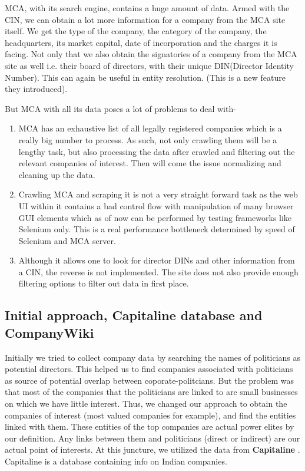 MCA, with its search engine, contains a huge amount of data. Armed with the CIN, we can obtain a lot more information for a company from the MCA site itself. We get the type of the company, the category of the company, the headquarters, its market capital, date of incorporation and the charges it is facing. Not only that we also obtain the signatories of a company from the MCA site as well i.e. their board of directors, with their unique DIN(Director Identity Number). This can again be useful in entity resolution. (This is a new feature they introduced).

But MCA with all its data poses a lot of problems to deal with-
\begin{enumerate}
    \item MCA has an exhaustive list of all legally registered companies which is a really big number to process. As such, not only crawling  them will be a lengthy task, but also processing the data after crawled and filtering out the relevant companies of interest. Then will come the issue normalizing and cleaning up the data.
    \item Crawling MCA and scraping it is not a very straight forward task as the web UI within it contains a bad control flow with  manipulation of many browser GUI elements which as of now can be performed by testing frameworks like Selenium only. This is a real performance bottleneck determined by speed of Selenium and MCA server. 
    \item Although it allows one to look for director DINs and other information from a CIN, the reverse is not implemented. The site does not also provide enough filtering options to filter out data in first place.
\end{enumerate}

\subsection{Initial approach, Capitaline database and CompanyWiki}

Initially we tried to collect company data by searching the names of politicians as potential directors. This helped us to find companies associated with politicians as source of potential overlap between coporate-politcians. But the problem was that most of the companies that the politicians are linked to are small businesses on which we have little interest. Thus, we changed our approach to obtain the companies of interest (most valued companies for example), and find the entities linked with them. These entities of the top companies are actual power elites by our definition. Any links between them and politicians (direct or indirect) are our actual point of interests.
At this juncture, we utilized the data from \textbf{Capitaline} \cite{capitaline}. Capitaline is a database containing info on Indian companies. 

